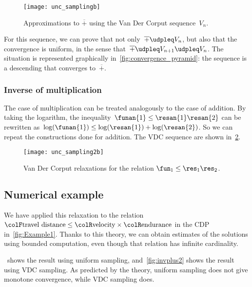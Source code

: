 \begin{figure}[h]
    \centering
    \texttt{[image: unc\_samplingb]}
    \caption{
        Approximations to $\overline{+}$ using the Van Der Corput sequence~$V_{n}$.
    }
    \label{fig:Vn}
\end{figure}

For this sequence, we can prove that not only~$\overline{+}\udpleq V_{n}$, but also that the convergence is uniform, in the sense that~$\overline{+}\udpleq V_{n+1}\udpleq V_{n}$.
The situation is represented graphically in~\cref{fig:convergence_pyramid}: the sequence is a descending   that converges to~$\overline{+}$.

\subsubsection{Inverse of multiplication}

The case of multiplication can be treated analogously to the case of addition.
By taking the logarithm, the inequality~$\funan{1}\leq\resan{1}\resan{2}$ can be rewritten as~$\log(\funan{1})\leq\log(\resan{1})+\log(\resan{2})$.
So we can repeat the constructions done for addition.
The VDC sequence are shown in~\cref{fig:approx_invmult}.

\begin{figure}[h]
    \centering
    \texttt{[image: unc\_sampling2b]}
    \caption{
        Van Der Corput relaxations for the relation $\fun_{1}\leq\res_{1}\res_{2}$.}
    \label{fig:approx_invmult}
\end{figure}

\subsection{Numerical example}

We have applied this relaxation to the relation ${\colF\text{travel distance}}\leq{\colR\text{velocity}}\times{\colR\text{endurance}}$ in the CDP in~\cref{fig:Example1}.
Thanks to this theory, we can obtain estimates of the solutions using bounded computation, even though that relation has infinite cardinality.

~shows the result using uniform sampling, and~\cref{fig:invplus2} shows the result using VDC sampling.
As predicted by the theory, uniform sampling does not give monotone convergence, while VDC sampling does.
\vfill

